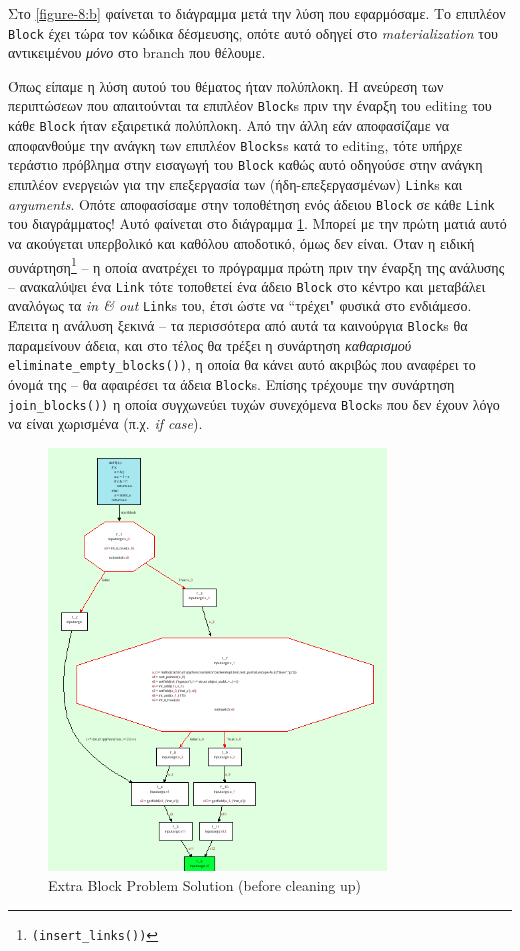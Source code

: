 Στο \ref{figure-8:b} φαίνεται το διάγραμμα μετά την λύση που εφαρμόσαμε. Το
επιπλέον \texttt{Block} έχει τώρα τον κώδικα δέσμευσης, οπότε αυτό οδηγεί στο
\textit{materialization} του αντικειμένου \textit{μόνο} στο branch που θέλουμε.

Όπως είπαμε η λύση αυτού του θέματος ήταν πολύπλοκη. Η ανεύρεση των περιπτώσεων
που απαιτούνται τα επιπλέον \texttt{Block}s πριν την έναρξη του editing του κάθε
\texttt{Block} ήταν εξαιρετικά πολύπλοκη. Από την άλλη εάν αποφασίζαμε να
αποφανθούμε την ανάγκη των επιπλέον \texttt{Blocks}s κατά το editing, τότε
υπήρχε τεράστιο πρόβλημα στην εισαγωγή του \texttt{Block} καθώς αυτό οδηγούσε
στην ανάγκη επιπλέον ενεργειών για την επεξεργασία των (ήδη-επεξεργασμένων)
\texttt{Link}s και \textit{arguments}. Οπότε αποφασίσαμε στην τοποθέτηση ενός
άδειου \texttt{Block} σε κάθε \texttt{Link} του διαγράμματος! Αυτό φαίνεται στο
διάγραμμα \ref {figure-8c}. Μπορεί με την πρώτη ματιά αυτό να ακούγεται
υπερβολικό και καθόλου αποδοτικό, όμως δεν είναι. Όταν η ειδική
συνάρτηση\footnote{\texttt{(insert\_links())}} – η οποία ανατρέχει το πρόγραμμα
πρώτη πριν την έναρξη της ανάλυσης – ανακαλύψει ένα \texttt{Link} τότε τοποθετεί
ένα άδειο \texttt{Block} στο κέντρο και μεταβάλει αναλόγως τα \textit{in \& out}
\texttt{Link}s του, έτσι ώστε να ``τρέχει" φυσικά στο ενδιάμεσο. Έπειτα η ανάλυση
ξεκινά – τα περισσότερα από αυτά τα καινούργια \texttt{Block}s θα παραμείνουν
άδεια, και στο τέλος θα τρέξει η συνάρτηση \textit{καθαρισμού}
\texttt{eliminate\_empty\_blocks())}, η οποία θα κάνει αυτό ακριβώς που αναφέρει
το όνομά της – θα αφαιρέσει τα άδεια \texttt{Block}s. Επίσης τρέχουμε την
συνάρτηση \texttt{join\_blocks())} η οποία συγχωνεύει τυχών συνεχόμενα
\texttt{Block}s που δεν έχουν λόγο να είναι χωρισμένα (π.χ. \textit{if case}).

\begin{figure}[h]
\centering
\includegraphics[width=0.8\textwidth]{needs-extra-block-med.png}
\caption{Extra Block Problem Solution (before cleaning up)}
\label{figure-8c}
\end{figure}


